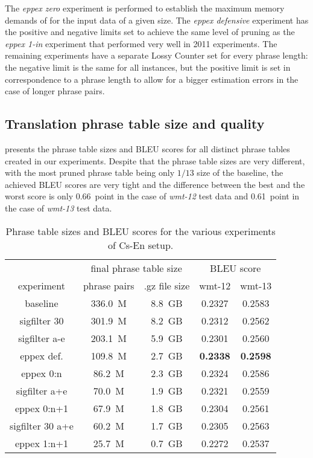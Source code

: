 The \emph{eppex zero} experiment is performed to establish the maximum memory demands of \eppex{}
for the input data of a given size.
The \emph{eppex defensive} experiment has the positive and negative limits set to achieve the same
level of pruning as the \emph{eppex 1-in} experiment that performed very well in 2011 experiments.
The remaining \eppex{} experiments have a separate Lossy Counter set for every phrase length:
the negative limit is the same for all instances, but the positive limit is set in correspondence
to a phrase length to allow for a bigger estimation errors in the case of longer phrase pairs.

\subsection{Translation phrase table size and quality}

 presents the phrase table sizes and BLEU scores for all
distinct phrase tables created in our experiments.
Despite that the phrase table sizes are very different, with the most pruned phrase table being
only $1/13$ size of the baseline, the achieved BLEU scores are very tight and the difference
between the best and the worst score is only 0.66~point in the case of \emph{wmt-12} test data
and 0.61~point in the case of \emph{wmt-13} test data.

\begin{table}[ht]
\centering
\begin{tabular}{ | c | c c | c c | }
\hline
 & \multicolumn{2}{|c|}{final phrase table size} & \multicolumn{2}{|c|}{BLEU score} \\
experiment & phrase pairs & .gz file size & wmt-12 & wmt-13 \\
\hline
\hline
baseline          & 336.0~M & 8.8~GB & 0.2327 & 0.2583 \\
sigfilter 30      & 301.9~M & 8.2~GB & 0.2312 & 0.2562 \\
sigfilter a-e     & 203.1~M & 5.9~GB & 0.2301 & 0.2560 \\
eppex def.        & 109.8~M & 2.7~GB & \textbf{0.2338} & \textbf{0.2598} \\
eppex 0:n         &  86.2~M & 2.3~GB & 0.2324 & 0.2586 \\
sigfilter a+e     &  70.0~M & 1.9~GB & 0.2321 & 0.2559 \\
eppex 0:n+1       &  67.9~M & 1.8~GB & 0.2304 & 0.2561 \\
sigfilter 30 a+e  &  60.2~M & 1.7~GB & 0.2305 & 0.2563 \\
eppex 1:n+1       &  25.7~M & 0.7~GB & 0.2272 & 0.2537 \\
\hline
\end{tabular}
\caption{\label{cs-en-wmt13-pt-size-and-bleu}
Phrase table sizes and BLEU scores for the various experiments of Cs-En setup.}
\end{table}


